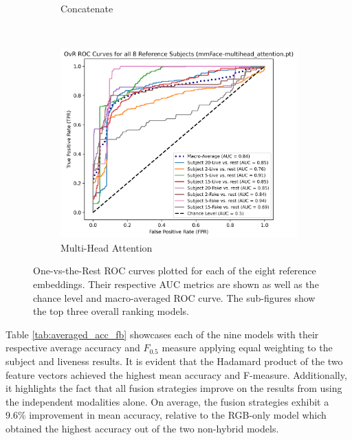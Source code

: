 \documentclass{mpaper}
\begin{document}
\begin{figure}[ht!]
\begin{subfigure}[b]{0.315\textwidth}
        \caption{Concatenate}
        \label{fig:roc_concatenate}
    \end{subfigure}
    ~\hspace{0.001cm}
    \begin{subfigure}[b]{0.325\textwidth}
        \includegraphics[width=1.09\textwidth]{figures/roc_multihead_attention.png}
        \caption{Multi-Head Attention}
        \label{fig:roc_multihead_attention}
    \end{subfigure}
    \vspace{0.1cm}
    \caption{One-vs-the-Rest ROC curves plotted for each of the eight reference embeddings. Their respective AUC metrics are shown as well as the chance level and macro-averaged ROC curve. The sub-figures show the top three overall ranking models.}
    \vspace{-0.35cm}
\end{figure}

Table \ref{tab:averaged_acc_fb} showcases each of the nine models with their respective average accuracy and $F_{0.5}$ measure applying equal weighting to the subject and liveness results. It is evident that the Hadamard product of the two feature vectors achieved the highest mean accuracy and F-measure. Additionally, it highlights the fact that all fusion strategies improve on the results from using the independent modalities alone. On average, the fusion strategies exhibit a 9.6\% improvement in mean accuracy, relative to the RGB-only model which obtained the highest accuracy out of the two non-hybrid models.
\end{document}

